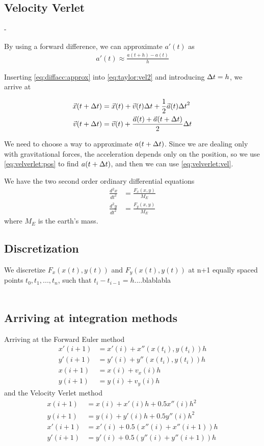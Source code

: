 \documentclass[a4paper]{article}
\begin{document}
\subsection{Velocity Verlet}-

By using a forward difference, we can approximate $a'(t)$ as
\begin{align}
    a'(t) \approx \frac{a(t+h) - a(t)}{h} \label{eq:diffacc:approx}
\end{align}

Inserting \eqref{eq:diffacc:approx} into \eqref{eq:taylor:vel2} and introducing ${\Delta t} = h$, we arrive at


\begin{align}
\vec{x}(t + {\Delta t}) &= \vec{x}(t) + \vec{v}(t){\Delta t} + \frac{1}{2} \vec{a}(t) {\Delta t}^2 \label{eq:velverlet:pos} \\
\vec{v}(t + {\Delta t}) &= \vec{v}(t) + \frac{\vec{a}(t) + \vec{a}(t + {\Delta t})}{2} {\Delta t} \label{eq:velverlet:vel}
\end{align}

We need to choose a way to approximate $a(t + {\Delta t})$. Since we are dealing only with gravitational forces, the acceleration depends only on the position, so we use \eqref{eq:velverlet:pos} to find $a(t + {\Delta t})$, and then we can use \eqref{eq:velverlet:vel}.



We have the two second order ordinary differential equations
\begin{align}
\frac{d^2x}{dt^2} &= \frac{F_x(x,y)}{M_E} \\
\frac{d^2y}{dt^2} &= \frac{F_y(x,y)}{M_E}
\end{align}
where $M_E$ is the earth's mass.\\

\subsection{Discretization}
We discretize $F_x(x(t),y(t))$ and $F_y(x(t),y(t))$ at n+1 equally spaced points $t_0, t_1,..., t_n$, such that $t_i - t_{i-1} = h$....blablabla\\
\\
\subsection{Arriving at integration methods}
Arriving at the Forward Euler method
\begin{align}
x'(i+1) &= x'(i) + x''(x(t_i), y(t_i))h\\
y'(i+1) &= y'(i) + y''(x(t_i), y(t_i))h\\
x(i+1) &= x(i) + v_x(i)h\\
y(i+1) &= y(i) + v_y(i)h
\end{align}
and the Velocity Verlet method
\begin{align}
x(i+1) &= x(i) + x'(i)h + 0.5x''(i)h^2\\
y(i+1) &= y(i) + y'(i)h + 0.5y''(i)h^2\\
x'(i+1) &= x'(i) + 0.5(x''(i) + x''(i+1))h\\
y'(i+1) &= y'(i) + 0.5(y''(i) + y''(i+1))h
\end{align}
\end{document}
